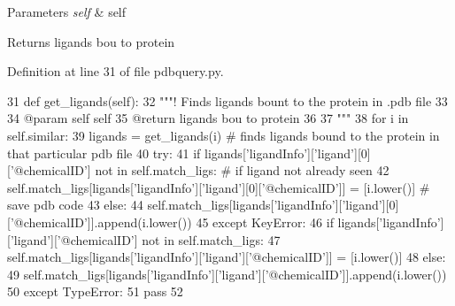 \begin{DoxyParams}{Parameters}
{\em self} & self \\
\hline
\end{DoxyParams}
\begin{DoxyReturn}{Returns}
ligands bou to protein 
\end{DoxyReturn}


Definition at line 31 of file pdbquery.\+py.


\begin{DoxyCode}
31     \textcolor{keyword}{def }get\_ligands(self):
32         \textcolor{stringliteral}{"""! Finds ligands bount to the protein in .pdb file}
33 \textcolor{stringliteral}{}
34 \textcolor{stringliteral}{        @param self self}
35 \textcolor{stringliteral}{        @return ligands bou to protein}
36 \textcolor{stringliteral}{}
37 \textcolor{stringliteral}{        """}
38         \textcolor{keywordflow}{for} i \textcolor{keywordflow}{in} self.similar:
39             ligands = get\_ligands(i)  \textcolor{comment}{# finds ligands bound to the protein in that particular pdb file}
40             \textcolor{keywordflow}{try}:
41                 \textcolor{keywordflow}{if} ligands[\textcolor{stringliteral}{'ligandInfo'}][\textcolor{stringliteral}{'ligand'}][0][\textcolor{stringliteral}{'@chemicalID'}] \textcolor{keywordflow}{not} \textcolor{keywordflow}{in} self.match\_ligs:  \textcolor{comment}{# if ligand
       not already seen}
42                     self.match\_ligs[ligands[\textcolor{stringliteral}{'ligandInfo'}][\textcolor{stringliteral}{'ligand'}][0][\textcolor{stringliteral}{'@chemicalID'}]] = [i.lower()]   \textcolor{comment}{#
       save pdb code}
43                 \textcolor{keywordflow}{else}:
44                     self.match\_ligs[ligands[\textcolor{stringliteral}{'ligandInfo'}][\textcolor{stringliteral}{'ligand'}][0][\textcolor{stringliteral}{'@chemicalID'}]].append(i.lower())
45             \textcolor{keywordflow}{except} KeyError:
46                 \textcolor{keywordflow}{if} ligands[\textcolor{stringliteral}{'ligandInfo'}][\textcolor{stringliteral}{'ligand'}][\textcolor{stringliteral}{'@chemicalID'}] \textcolor{keywordflow}{not} \textcolor{keywordflow}{in} self.match\_ligs:
47                     self.match\_ligs[ligands[\textcolor{stringliteral}{'ligandInfo'}][\textcolor{stringliteral}{'ligand'}][\textcolor{stringliteral}{'@chemicalID'}]] = [i.lower()]
48                 \textcolor{keywordflow}{else}:
49                     self.match\_ligs[ligands[\textcolor{stringliteral}{'ligandInfo'}][\textcolor{stringliteral}{'ligand'}][\textcolor{stringliteral}{'@chemicalID'}]].append(i.lower())
50             \textcolor{keywordflow}{except} TypeError:
51                 \textcolor{keywordflow}{pass}
52 
\end{DoxyCode}

